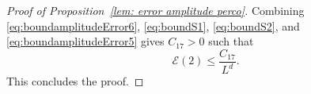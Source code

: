 \documentclass[11pt,a4paper]{article}
\numberwithin{equation}{section}
\theoremstyle{plain}
\theoremstyle{definition}
\newcommand\bfC{\mathbf{C}}
\newcommand{\connect}{\xleftrightarrow}
\begin{document}
\begin{proof}[Proof of Proposition~\textup{\ref{lem: error amplitude perco}}]
Combining \eqref{eq:boundamplitudeError6}, \eqref{eq:boundS1}, \eqref{eq:boundS2}, and \eqref{eq:boundamplitudeError5} gives $C_{17}>0$ such that 
\begin{equation}
	\mathcal E(2)\leq \frac{C_{17}}{L^d}.
\end{equation}
This concludes the proof.

\end{proof}
\end{document}
